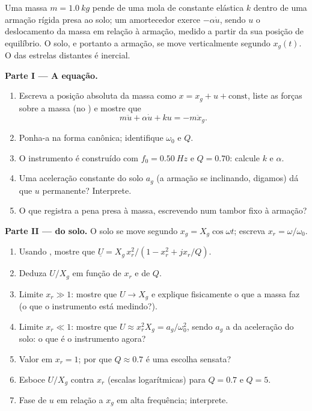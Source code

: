 \begin{problem}
\label{pb:b1:oscillators-resonance:1}
Uma massa $m = \qty{1.0}{kg}$ pende de uma mola de constante elástica $k$ dentro
de uma armação rígida presa ao solo; um amortecedor exerce $-\alpha\dot u$, sendo
$u$ o deslocamento da massa em relação à armação, medido
a partir da sua posição de equilíbrio. O solo, e portanto a armação, se move
verticalmente segundo $x_g(t)$. O  das estrelas distantes é inercial.

\medskip
\noindent\textbf{Parte I --- A equação.}
\begin{enumerate}
  \item Escreva a posição absoluta da massa como $x = x_g + u +
        \text{const}$, liste as forças sobre a massa (no ) e mostre que
        \[
        m\ddot u + \alpha\dot u + ku = -m\ddot x_g .
        \]
  \item Ponha-a na forma canônica; identifique $\omega_0$ e $Q$.
  \item O instrumento é construído com $f_0 = \qty{0.50}{Hz}$ e $Q = 0.70$:
        calcule $k$ e $\alpha$.
  \item Uma aceleração constante do solo $a_g$ (a armação se inclinando, digamos)
        dá que $u$ permanente? Interprete.
  \item O que registra a pena presa à massa, escrevendo num tambor fixo
        à armação?
\end{enumerate}

\medskip
\noindent\textbf{Parte II ---  do solo.}
O solo se move segundo $x_g = X_g\cos\omega t$; escreva $x_r = \omega/\omega_0$.
\begin{enumerate}[resume]
  \item Usando , mostre que $\underline U = X_g\,x_r^2/
        (1 - x_r^2 + jx_r/Q)$.
  \item Deduza $U/X_g$ em função de $x_r$ e de $Q$.
  \item Limite $x_r \gg 1$: mostre que $U \to X_g$ e explique fisicamente o que
        a massa faz (o que o instrumento está medindo?).
  \item Limite $x_r \ll 1$: mostre que $U \approx x_r^2X_g = a_g/\omega_0^2$, sendo
        $a_g$ a  da aceleração do solo: o que é o instrumento
        agora?
  \item Valor em $x_r = 1$; por que $Q \approx 0.7$ é uma escolha sensata?
  \item Esboce $U/X_g$ contra $x_r$ (escalas logarítmicas) para $Q = 0.7$ e
        $Q = 5$.
  \item Fase de $u$ em relação a $x_g$ em alta frequência; interprete.
\end{enumerate}


\end{problem}
